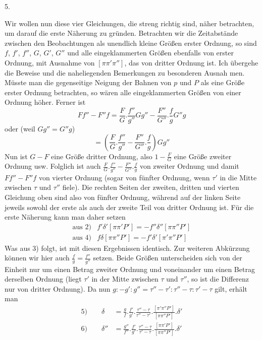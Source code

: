 \begin{center}5.\end{center}
Wir wollen nun diese vier Gleichungen, die streng richtig sind, näher betrachten, um darauf die erste Näherung zu gründen. Betrachten wir die Zeitabstände zwischen den Beobachtungen als unendlich kleine Größen erster Ordnung, so sind $f$, $f'$, $f''$, $G$, $G'$, $G''$ und alle eingeklammerten Größen ebenfalls von erster Ordnung, mit Ausnahme von $[\pi\pi'\pi'']$, das von dritter Ordnung ist. Ich übergehe die Beweise und die naheliegenden Bemerkungen zu besonderen Ausnah%
%
men. Müsste man die gegenseitige Neigung der Bahnen von $p$ und $P$ als eine Größe erster Ordnung betrachten, so wären alle eingeklammerten Größen von einer Ordnung höher. Ferner ist
\[
Ff''-F''f=\frac FG.\frac{f''}{g''}Gg''-\frac{F''}{G''}.\frac fg G''g
\]
oder (weil $Gg''=G''g$)
\[
=\left(\frac FG.\frac{f''}{g''}-\frac{F''}{G''}.\frac fg\right)Gg''
\]
Nun ist $G-F$ eine Größe dritter Ordnung, also $1-\frac FG$ eine Größe zweiter Ordnung usw. Folglich ist auch $\frac FG.\frac{f''}{g''}-\frac{F''}{G''}.\frac fg$ von zweiter Ordnung und damit $Ff''-F''f$ von vierter Ordnung (sogar von fünfter Ordnung, wenn $\tau'$ in die Mitte zwischen $\tau$ und $\tau''$ fiele). Die rechten Seiten der zweiten, dritten und vierten Gleichung oben sind also von fünfter Ordnung, während auf der linken Seite jeweils sowohl der erste als auch der zweite Teil von dritter Ordnung ist. Für die erste Näherung kann man daher setzen
\[
\begin{array}{ll}
\text{aus 2)}&f'\delta'[\pi\pi'P']=-f''\delta''[\pi\pi''P']\\
\text{aus 4)}&f\delta[\pi\pi''P']=-f'\delta'[\pi'\pi''P']
\end{array}
\]
Was aus 3) folgt, ist mit diesen Ergebnissen identisch. Zur weiteren Abkürzung können wir hier auch $\frac fg=\frac{f''}{g''}$ setzen. Beide Größen unterscheiden sich von der Einheit nur um einen Betrag zweiter Ordnung und voneinander um einen Betrag derselben Ordnung (liegt $\tau'$ in der Mitte zwischen $\tau$ und $\tau''$, so ist die Differenz nur von dritter Ordnung). Da nun $g:-g':g''=\tau''-\tau':\tau''-\tau:\tau'-\tau$ gilt, erhält man
\[
\begin{aligned}
5)\qquad\delta&=\frac gf.\frac{f'}{g'}.\frac{\tau''-\tau}{\tau''-\tau'}.\frac{[\pi'\pi''P']}{[\pi\pi''P']}.\delta'\\
6)\qquad\delta''&=\frac{g''}{f''}.\frac{f'}{g'}.\frac{\tau''-\tau}{\tau'-\tau}.\frac{[\pi\pi'P']}{[\pi\pi''P']}.\delta'
\end{aligned}
\]

